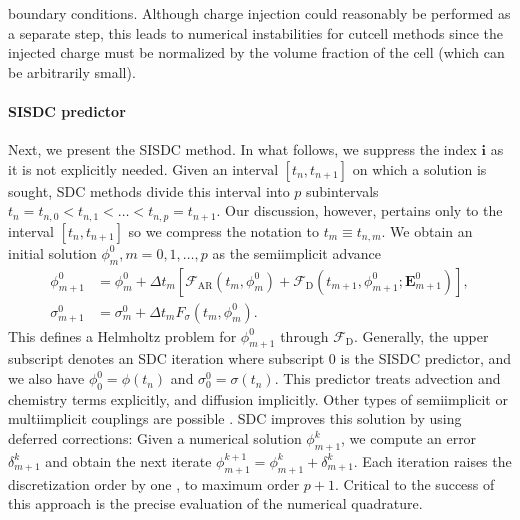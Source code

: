 \documentclass[letterpaper,10pt,english]{sphinxmanual}
\begin{document}
boundary conditions. Although charge injection could reasonably be performed as a separate step, this leads to numerical instabilities for cut\sphinxhyphen{}cell methods since the injected charge must be normalized by the volume fraction of the cell (which can be arbitrarily small).


\paragraph{SISDC predictor}
\label{\detokenize{MinimalPlasmaModel:sisdc-predictor}}
Next, we present the SISDC method. In what follows, we suppress the index \({\mathbf{i}}\) as it is not explicitly needed. Given an interval \([t_n, t_{n+1}]\) on which a solution is sought, SDC methods divide this interval into \(p\) subintervals \(t_n = t_{n,0} < t_{n,1} < \ldots < t_{n,p} = t_{n+1}\). Our discussion, however, pertains only to the interval \([t_n, t_{n+1}]\) so we compress the notation to \(t_m\equiv t_{n,m}\). We obtain an initial solution \(\phi_{m}^0, m=0,1,\ldots,p\) as the semi\sphinxhyphen{}implicit advance
\begin{align}
\phi_{m+1}^0 &= \phi_m^0 + \Delta t_m\left[\mathcal{F}_{\textrm{AR}}\left(t_m,\phi_m^0\right) + \mathcal{F}_{\textrm{D}}\left(t_{m+1},\phi_{m+1}^0; \mathbf{E}_{m+1}^0\right)\right],\\
\sigma_{m+1}^0 &= \sigma_m^0 + \Delta t_mF_\sigma\left(t_m,\phi_m^0\right).
\end{align}
This defines a Helmholtz problem for \(\phi_{m+1}^0\) through \(\mathcal{F}_{\textrm{D}}\). Generally, the upper subscript denotes an SDC iteration where subscript 0 is the SISDC predictor, and we also have \(\phi_0^0 = \phi(t_n)\) and \(\sigma_0^0 = \sigma(t_n)\). This predictor treats advection and chemistry terms explicitly, and diffusion implicitly. Other types of semi\sphinxhyphen{}implicit or multi\sphinxhyphen{}implicit couplings are possible . SDC improves this solution by using deferred corrections: Given a numerical solution \(\phi_{m+1}^k\), we compute an error \(\delta_{m+1}^k\) and obtain the next iterate \(\phi_{m+1}^{k+1} = \phi_{m+1}^k + \delta_{m+1}^k\). Each iteration raises the discretization order by one , to maximum order \(p+1\). Critical to the success of this approach is the precise evaluation of the numerical quadrature.
\end{document}
